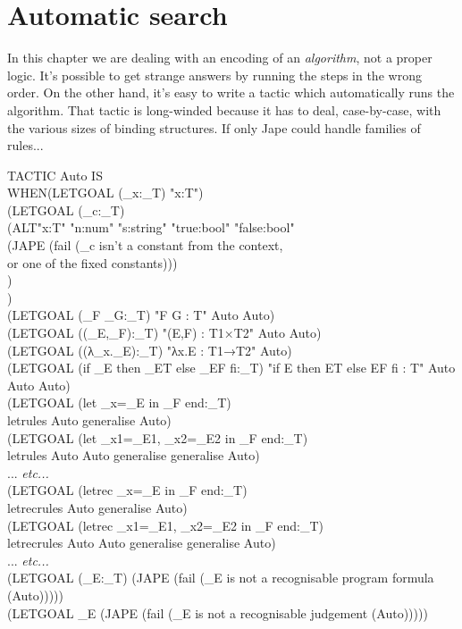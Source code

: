 \section{Automatic search}

In this chapter we are dealing with an encoding of an \textit{algorithm}, not a proper logic. It's possible to get strange answers by running the steps in the wrong order. On the other hand, it's easy to write a tactic which automatically runs the algorithm. That tactic is long-winded because it has to deal, case-by-case, with the various sizes of binding structures. If only Jape could handle families of rules...

\begin{japeish}
TACTIC Auto IS\\
\tab WHEN\tab (LETGOAL (\_x:\_T) "x:T")\\
\tab \tab (LETGOAL (\_c:\_T) \\
\tab \tab \tab (ALT\tab "x:T" "n:num" "s:string" "true:bool" "false:bool"\\
\tab \tab \tab \tab (JAPE (fail (\_c isn't a constant from the context, \\
\tab \tab \tab \tab \tab \tab \tab or one of the fixed constants))) \\
\tab \tab \tab )\\
\tab \tab )\\
\tab \tab (LETGOAL (\_F \_G:\_T) "F G : T" Auto Auto)\\
\tab \tab (LETGOAL ((\_E,\_F):\_T) "(E,F) : T1×T2" Auto Auto)\\
\tab \tab (LETGOAL ((λ\_x.\_E):\_T) "λx.E : T1→T2" Auto)\\
\tab \tab (LETGOAL (if \_E then \_ET else \_EF fi:\_T) "if E then ET else EF fi : T" Auto Auto Auto)\\
\tab \tab (LETGOAL (let \_x=\_E in \_F end:\_T) \\
\tab \tab \tab \tab letrules Auto generalise Auto)\\
\tab \tab (LETGOAL (let \_x1=\_E1, \_x2=\_E2 in \_F end:\_T) \\
\tab \tab \tab \tab letrules Auto Auto generalise generalise Auto)\\
\tab \tab ... \textit{etc...}\\
\tab \tab (LETGOAL (letrec \_x=\_E in \_F end:\_T) \\
\tab \tab \tab \tab letrecrules Auto generalise Auto)\\
\tab \tab (LETGOAL (letrec \_x1=\_E1, \_x2=\_E2 in \_F end:\_T) \\
\tab \tab \tab \tab letrecrules Auto Auto generalise generalise Auto)\\
\tab \tab ... \textit{etc...}\\
\tab \tab (LETGOAL (\_E:\_T) (JAPE (fail (\_E is not a recognisable program formula (Auto)))))\\
\tab \tab (LETGOAL \_E (JAPE (fail (\_E is not a recognisable judgement (Auto)))))
\end{japeish}

